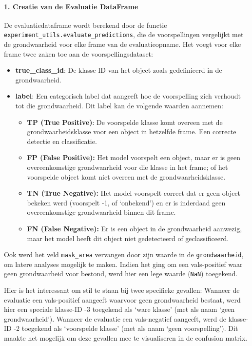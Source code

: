 \paragraph{1. Creatie van de Evaluatie DataFrame}
De evaluatiedataframe wordt berekend door de functie\\ \texttt{experiment\_utils.evaluate\_predictions},
die de voorspellingen vergelijkt met de grondwaarheid voor elke frame van de evaluatieopname.
Het voegt voor elke frame twee zaken toe aan de voorspellingsdataset:
\begin{itemize}
    \item \textbf{true\_class\_id}: De klasse-ID van het object zoals gedefinieerd in de grondwaarheid.
    \item \textbf{label}: Een categorisch label dat aangeeft hoe de voorspelling zich verhoudt tot die grondwaarheid. Dit label kan de volgende waarden aannemen:
        \begin{itemize}
            \item \textbf{TP (True Positive)}: De voorspelde klasse komt overeen met de grondwaarheidsklasse voor een object in hetzelfde frame. 
            Een correcte detectie en classificatie.
            \item \textbf{FP (False Positive):} Het model voorspelt een object, maar er is geen overeenkomstige grondwaarheid 
            voor die klasse in het frame; of het voorspelde object komt niet overeen met de grondwaarheidsklasse.
            \item \textbf{TN (True Negative):} Het model voorspelt correct dat er geen object bekeken werd (voorspelt -1, of `onbekend') 
            en er is inderdaad geen overeenkomstige grondwaarheid binnen dit frame.
            \item \textbf{FN (False Negative):} Er is een object in de grondwaarheid aanwezig, maar het model heeft dit object niet gedetecteerd of geclassificeerd.
        \end{itemize} 
\end{itemize}
Ook werd het veld \texttt{mask\_area} vervangen door zijn waarde in de \texttt{grondwaarheid}, om latere analyses mogelijk te maken.
Indien het ging om een vals-positief waar geen grondwaarheid voor bestond, werd hier een lege waarde (\texttt{NaN}) toegekend. 

Hier is het interessant om stil te staan bij twee specifieke gevallen:
Wanneer de evaluatie een vals-positief aangeeft waarvoor geen grondwaarheid bestaat, werd hier een speciale klasse-ID -3 toegekend als `ware klasse' (met als naam `geen grondwaarheid').
Wanneer de evaluatie een vals-negatief aangeeft, werd de klasse-ID -2 toegekend als `voorspelde klasse' (met als naam `geen voorspelling').
Dit maakte het mogelijk om deze gevallen mee te visualiseren in de confusion matrix.

